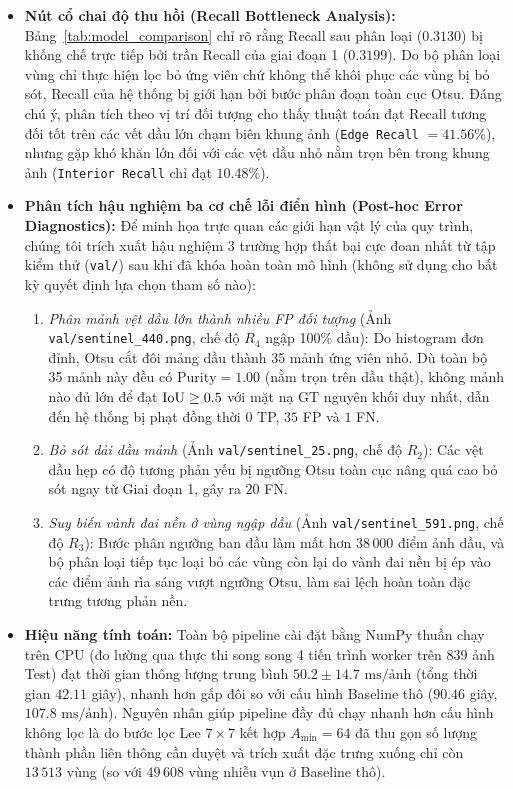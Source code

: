 \begin{itemize}
    \item \textbf{Nút cổ chai độ thu hồi (Recall Bottleneck Analysis):} Bảng~\ref{tab:model_comparison} chỉ rõ rằng Recall sau phân loại ($0.3130$) bị khống chế trực tiếp bởi trần Recall của giai đoạn 1 ($0.3199$). Do bộ phân loại vùng chỉ thực hiện lọc bỏ ứng viên chứ không thể khôi phục các vùng bị bỏ sót, Recall của hệ thống bị giới hạn bởi bước phân đoạn toàn cục Otsu. Đáng chú ý, phân tích theo vị trí đối tượng cho thấy thuật toán đạt Recall tương đối tốt trên các vết dầu lớn chạm biên khung ảnh (\texttt{Edge Recall} $= 41.56\%$), nhưng gặp khó khăn lớn đối với các vệt dầu nhỏ nằm trọn bên trong khung ảnh (\texttt{Interior Recall} chỉ đạt $10.48\%$).
    \item \textbf{Phân tích hậu nghiệm ba cơ chế lỗi điển hình (Post-hoc Error Diagnostics):} Để minh họa trực quan các giới hạn vật lý của quy trình, chúng tôi trích xuất hậu nghiệm 3 trường hợp thất bại cực đoan nhất từ tập kiểm thử (\texttt{val/}) sau khi đã khóa hoàn toàn mô hình (không sử dụng cho bất kỳ quyết định lựa chọn tham số nào):
    \begin{enumerate}
        \item \textit{Phân mảnh vệt dầu lớn thành nhiều FP đối tượng} (Ảnh \texttt{val/sentinel\_440.png}, chế độ $R_4$ ngập 100\% dầu): Do histogram đơn đỉnh, Otsu cắt đôi mảng dầu thành 35 mảnh ứng viên nhỏ. Dù toàn bộ 35 mảnh này đều có $\mathrm{Purity} = 1.00$ (nằm trọn trên dầu thật), không mảnh nào đủ lớn để đạt $\mathrm{IoU} \ge 0.5$ với mặt nạ GT nguyên khối duy nhất, dẫn đến hệ thống bị phạt đồng thời $0$ TP, $35$ FP và $1$ FN.
        \item \textit{Bỏ sót dải dầu mảnh} (Ảnh \texttt{val/sentinel\_25.png}, chế độ $R_2$): Các vệt dầu hẹp có độ tương phản yếu bị ngưỡng Otsu toàn cục nâng quá cao bỏ sót ngay từ Giai đoạn 1, gây ra $20$ FN.
        \item \textit{Suy biến vành đai nền ở vùng ngập dầu} (Ảnh \texttt{val/sentinel\_591.png}, chế độ $R_3$): Bước phân ngưỡng ban đầu làm mất hơn $38\,000$ điểm ảnh dầu, và bộ phân loại tiếp tục loại bỏ các vùng còn lại do vành đai nền bị ép vào các điểm ảnh rìa sáng vượt ngưỡng Otsu, làm sai lệch hoàn toàn đặc trưng tương phản nền.
    \end{enumerate}
    \item \textbf{Hiệu năng tính toán:} Toàn bộ pipeline cài đặt bằng NumPy thuần chạy trên CPU (đo lường qua thực thi song song 4 tiến trình worker trên 839 ảnh Test) đạt thời gian thông lượng trung bình $50.2 \pm 14.7\text{ ms/ảnh}$ (tổng thời gian $42.11$ giây), nhanh hơn gấp đôi so với cấu hình Baseline thô ($90.46$ giây, $107.8\text{ ms/ảnh}$). Nguyên nhân giúp pipeline đầy đủ chạy nhanh hơn cấu hình không lọc là do bước lọc Lee $7 \times 7$ kết hợp $A_{\min} = 64$ đã thu gọn số lượng thành phần liên thông cần duyệt và trích xuất đặc trưng xuống chỉ còn $13\,513$ vùng (so với $49\,608$ vùng nhiễu vụn ở Baseline thô).
\end{itemize}

